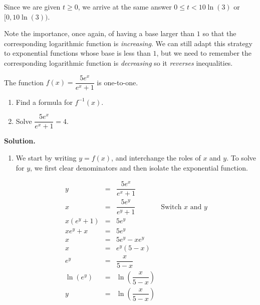 \documentclass{ximera}
\begin{document}
Since we are given $t \geq 0$, we arrive at the same answer $0 \leq t < 10\ln(3)$ or $[0, 10 \ln(3))$.  

\smallskip

Note the importance, once again, of having a base larger than $1$ so that the corresponding logarithmic function is \textit{increasing}.  We can still adapt this strategy to exponential functions whose base is less than $1$, but we need to remember the corresponding logarithmic function is \textit{decreasing} so it \textit{reverses}  inequalities.  


\newpage

\begin{example}  \label{expfracinverse} The function $f(x) = \dfrac{5e^{x}}{e^{x}+1}$ is one-to-one. 

\begin{multicols}{2} 

\begin{enumerate}

\item Find a formula for $f^{-1}(x)$.

\item  Solve $\dfrac{5e^{x}}{e^{x}+1} = 4$.

\end{enumerate}

\end{multicols}

{\bf Solution.}  \begin{enumerate} \item We start by writing $y=f(x)$, and interchange the roles of $x$ and $y$.  To solve for $y$, we first clear denominators and then isolate the exponential function.

\[ \begin{array}{rclr}
y & = & \dfrac{5e^{x}}{e^{x}+1} & \\ [12pt]
x & = & \dfrac{5e^{y}}{e^{y}+1} & \mbox{Switch $x$ and $y$} \\ [12pt]
x \left(e^{y}+1\right) & = & 5e^{y} & \\ [4pt]
x e^{y}+x & = & 5e^{y} & \\ [4pt]
x & = & 5e^{y} - x e^{y} & \\ [4pt]
x & = & e^{y}(5 - x) & \\ [4pt]
e^{y}& = & \dfrac{x}{5-x} & \\[12pt]
\ln\left(e^{y}\right) & = & \ln\left(\dfrac{x}{5-x}\right) & \\[12pt]
y & = & \ln\left(\dfrac{x}{5-x}\right) & \\
\end{array}\]


\end{enumerate}
\end{example}
\end{document}
